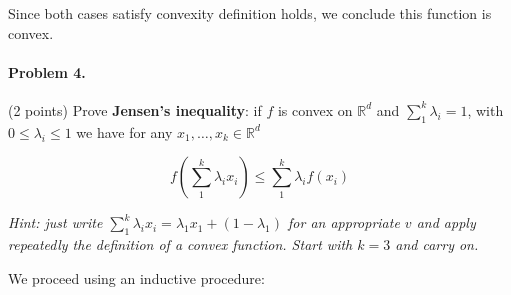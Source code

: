 \documentclass[12pt]{scrartcl}
\begin{document}
Since both cases satisfy convexity definition holds, we conclude this function is convex.

\vspace{1em}




\begin{boxF}
\paragraph*{Problem 4.} (2 points) \hspace{0.15em} Prove \textbf{Jensen's inequality}: if $f$ is convex on $\mathbb{R}^d$ and $\sum_1^k \lambda_i = 1$, with $0 \leq \lambda_i \leq 1$ we have for any $x_1, \dots, x_k \in \mathbb{R}^d$

    $$
    f\left(\sum_1^k \lambda_i x_i\right) \leq \sum_1^k \lambda_i f(x_i)
    $$

\textit{Hint: just write $\sum_1^k \lambda_i x_i = \lambda_1 x_1 + \left( 1 - \lambda_1\right)$ for an appropriate $v$ and apply repeatedly the definition of a convex function. Start with $k = 3$ and carry on.}

\end{boxF}

We proceed using an inductive procedure:
\end{document}
